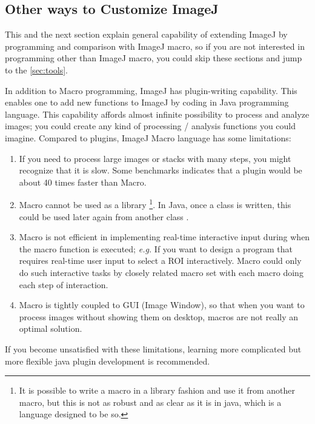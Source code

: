 \subsection{Other ways to Customize ImageJ}

This and the next section explain general capability of extending ImageJ by programming and comparison with ImageJ macro, so if you are not interested in programming other than ImageJ macro, you could skip these sections and jump to the \ref{sec:tools}.  

In addition to Macro programming, ImageJ has plugin-writing capability.  This enables one to add new functions to ImageJ by coding in Java programming language. 
This capability affords almost infinite possibility to process and analyze images; 
you could create any kind of processing / analysis functions you could imagine. 
Compared to plugins, ImageJ Macro language has some limitations: 

\begin{enumerate}
\item If you need to process large images or stacks with many steps, 
you might recognize that it is slow. 
Some benchmarks indicates that a plugin would be about 40 times faster than Macro. 

\item Macro cannot be used as a library
\footnote{It is possible to write a macro in a library fashion and use it from another macro, 
but this is not as robust and as clear as it is in java, which is a language designed to be so.}. 
In Java, once a class is written, this could be used later again from another class . 

\item Macro is not efficient in implementing real-time interactive input 
during when the macro function is executed; 
\textit{e.g.} If you want to design a program that requires real-time user input 
to select a ROI interactively.  
Macro could only do such interactive tasks by closely related macro set with each macro doing each step of interaction. 

\item Macro is tightly coupled to GUI (Image Window), so that when you want to process images without showing them on desktop, macros are not really an optimal solution.  
\end{enumerate}

If you become unsatisfied with these limitations, 
learning more complicated but more flexible java plugin development is recommended. 


